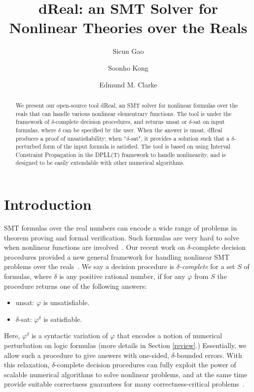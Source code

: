 \documentclass[envcountsect]{llncs}
\title{{\sf dReal}: an SMT Solver for Nonlinear Theories over the Reals}
\author{Sicun Gao \and Soonho Kong \and Edmund M. Clarke}
\institute{Carnegie Mellon University, Pittsburgh, PA 15213}
\begin{document}
\maketitle

\begin{abstract}
We present our open-source tool {\sf dReal}, an SMT solver for 
nonlinear formulas over the reals that can handle various nonlinear elementrary
functions. The tool is under the framework of $\delta$-complete decision
procedures, and returns {\sf unsat} or {\sf $\delta$-sat} on input formulas,
where $\delta$ can be specified by the user. When the answer is {\sf unsat},
{\sf dReal} produces a proof of unsatisfiability; when ``$\delta$-sat", it
provides a solution such that a $\delta$-perturbed form of the input formula is
satisfied. The tool is based on using Interval Constraint Propagation in the
DPLL(T) framework to handle nonlinearity, and is
designed to be easily extendable with other numerical algorithms.   
\end{abstract}

\section{Introduction}

SMT formulas over the real numbers can encode a wide range of problems in
theorem proving and formal verification. Such formulas are very hard to solve
when nonlinear functions are involved~\cite{}. Our recent work on
{$\delta$-complete decision procedures} provided a new general framework for
handling nonlinear SMT problems over the reals~\cite{}. We say a decision
procedure is {\em $\delta$-complete} for a set $S$ of formulas, where $\delta$
is any positive rational number, if for any $\varphi$ from $S$ the procedure
returns one of the following answers:
\begin{itemize}
 \item {\sf unsat}: $\varphi$ is unsatisfiable.
 \item {\sf $\delta$-sat}: $\varphi^{\delta}$ is satisfiable.
\end{itemize}
Here, $\varphi^{\delta}$ is a syntactic variation of $\varphi$ that encodes a
notion of numerical perturbation on logic formulas (more
details in Section \ref{review}.) Essentially, we allow such a procedure to
give answers with one-sided, $\delta$-bounded errors. With this relaxation,
$\delta$-complete decision procedures can fully exploit the
power of scalable numerical algorithms to solve nonlinear
problems, and at the same time provide suitable correctness
guarantees for many correctness-critical problems~\cite{}. 
\end{document}
